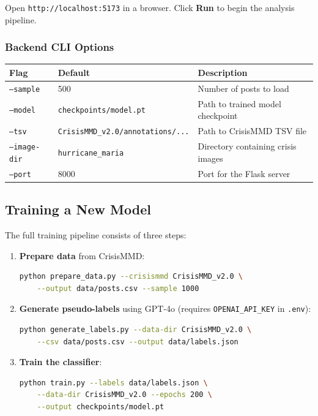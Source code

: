 \documentclass[11pt,a4paper]{article}
\begin{document}
Open \texttt{http://localhost:5173} in a browser. Click \textbf{Run} to begin the analysis pipeline.

\subsubsection{Backend CLI Options}

\begin{table}[H]
\centering
\begin{tabular}{lll}
\toprule
\textbf{Flag} & \textbf{Default} & \textbf{Description} \\
\midrule
\texttt{--sample} & 500 & Number of posts to load \\
\texttt{--model} & \texttt{checkpoints/model.pt} & Path to trained model checkpoint \\
\texttt{--tsv} & \texttt{CrisisMMD\_v2.0/annotations/...} & Path to CrisisMMD TSV file \\
\texttt{--image-dir} & \texttt{hurricane\_maria} & Directory containing crisis images \\
\texttt{--port} & 8000 & Port for the Flask server \\
\bottomrule
\end{tabular}
\end{table}

\subsection{Training a New Model}

The full training pipeline consists of three steps:

\begin{enumerate}
    \item \textbf{Prepare data} from CrisisMMD:
\begin{lstlisting}[language=bash]
python prepare_data.py --crisismmd CrisisMMD_v2.0 \
    --output data/posts.csv --sample 1000
\end{lstlisting}

    \item \textbf{Generate pseudo-labels} using GPT-4o (requires \texttt{OPENAI\_API\_KEY} in \texttt{.env}):
\begin{lstlisting}[language=bash]
python generate_labels.py --data-dir CrisisMMD_v2.0 \
    --csv data/posts.csv --output data/labels.json
\end{lstlisting}

    \item \textbf{Train the classifier}:
\begin{lstlisting}[language=bash]
python train.py --labels data/labels.json \
    --data-dir CrisisMMD_v2.0 --epochs 200 \
    --output checkpoints/model.pt
\end{lstlisting}
\end{enumerate}
\end{document}
